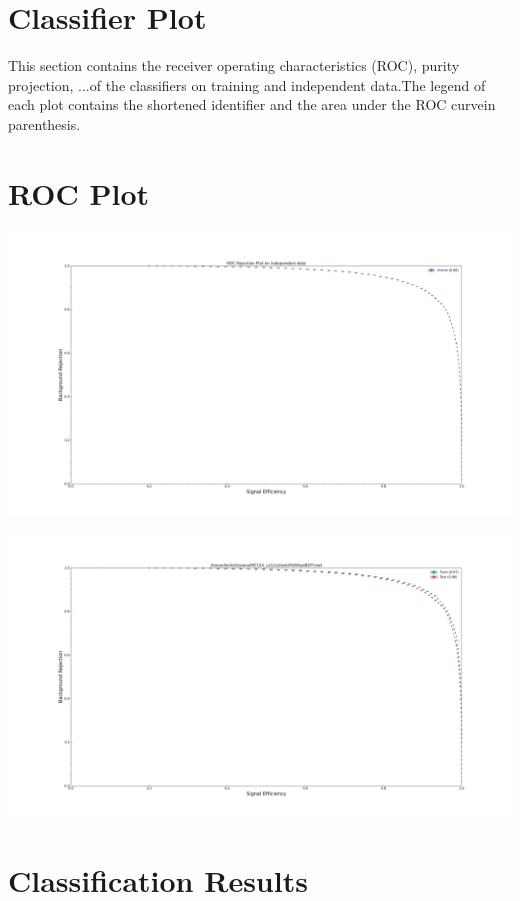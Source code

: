 \documentclass[10pt,a4paper]{article}
\begin{document}
\section{Classifier Plot}
This section contains the receiver operating characteristics (ROC), purity projection, ...of the classifiers on training and independent data.The legend of each plot contains the shortened identifier and the area under the ROC curvein parenthesis.\raggedbottom
\pagebreak[0]
\FloatBarrier
\section{ROC Plot}
\begin{center}
\includegraphics[width=1.0\textwidth]{roc_plot_test.pdf}
\end{center}
\begin{center}
\includegraphics[width=1.0\textwidth]{roc_test_-936217630058450507.pdf}
\end{center}
\raggedbottom
\pagebreak[0]
\FloatBarrier
\section{Classification Results}
\end{document}
